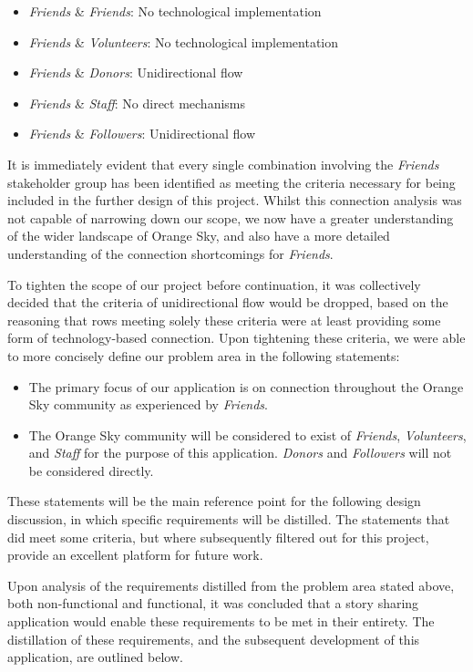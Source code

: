 \begin{itemize}
    \item \emph{Friends} \& \emph{Friends}: No technological implementation
    \item \emph{Friends} \& \emph{Volunteers}: No technological implementation
    \item \emph{Friends} \& \emph{Donors}: Unidirectional flow
    \item \emph{Friends} \& \emph{Staff}: No direct mechanisms
    \item \emph{Friends} \& \emph{Followers}: Unidirectional flow
\end{itemize}

It is immediately evident that every single combination involving the \emph{Friends} stakeholder group has been identified as meeting the criteria necessary for being included in the further design of this project. Whilst this connection analysis was not capable of narrowing down our scope, we now have a greater understanding of the wider landscape of Orange Sky, and also have a more detailed understanding of the connection shortcomings for \emph{Friends}.

To tighten the scope of our project before continuation, it was collectively decided that the criteria of unidirectional flow would be dropped, based on the reasoning that rows meeting solely these criteria were at least providing some form of technology-based connection. Upon tightening these criteria, we were able to more concisely define our problem area in the following statements:

\begin{itemize}
    \item The primary focus of our application is on connection throughout the Orange Sky community as experienced by \emph{Friends}.
    \item The Orange Sky community will be considered to exist of \emph{Friends}, \emph{Volunteers}, and \emph{Staff} for the purpose of this application. \emph{Donors} and \emph{Followers} will not be considered directly.
\end{itemize}

These statements will be the main reference point for the following design discussion, in which specific requirements will be distilled. The statements that did meet some criteria, but where subsequently filtered out for this project, provide an excellent platform for future work.

Upon analysis of the requirements distilled from the problem area stated above, both non-functional and functional, it was concluded that a story sharing application would enable these requirements to be met in their entirety. The distillation of these requirements, and the subsequent development of this application, are outlined below.

